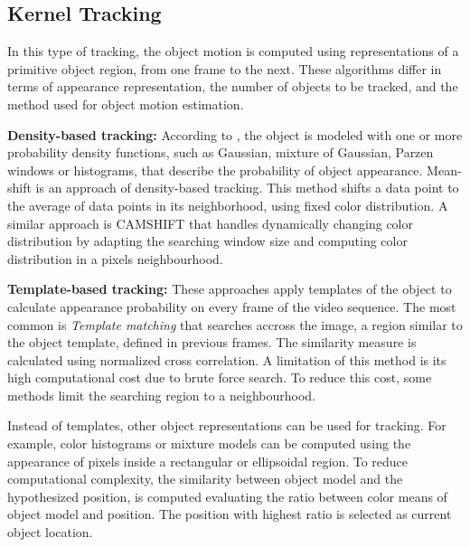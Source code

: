 \subsection{Kernel Tracking}

In this type of tracking, the object motion is computed using representations
of a primitive object region, from one frame to the next. These algorithms
differ in terms of appearance representation, the number of objects to be
tracked, and the method used for object motion estimation. 

\textbf{Density-based tracking:} According to \cite{Cheng1995}, the object is
modeled with one or more probability density functions, such as
Gaussian, mixture of Gaussian, Parzen windows or histograms, that describe
the probability of object appearance. Mean-shift is an approach of density-based
tracking. This method shifts a data point to the average of data points
in its neighborhood, using fixed color distribution. A similar
approach is CAMSHIFT \cite{Exner2010} that handles dynamically
changing color distribution by adapting the searching window size
and computing color distribution in a pixels neighbourhood.

\textbf{Template-based tracking:}  These approaches apply templates of the
object to calculate appearance probability on every frame of the
video sequence. The most common is \textit{Template \gls{matching}} \cite{Korman2013}
that searches accross the image, a region similar to the object template, defined
in previous frames. The similarity measure is calculated using normalized cross
correlation. A limitation of this method is its high computational cost due to
brute force search. To reduce this cost, some methods limit the searching region
to a neighbourhood.

Instead of templates, other object representations can be used for tracking.
For example, color histograms or mixture models can be computed using the
appearance of pixels inside a rectangular or ellipsoidal region. To reduce
computational complexity, the similarity between object model and the
hypothesized position, is computed evaluating the ratio between color means of
object model and position. The position with highest ratio is selected as
current object location.

